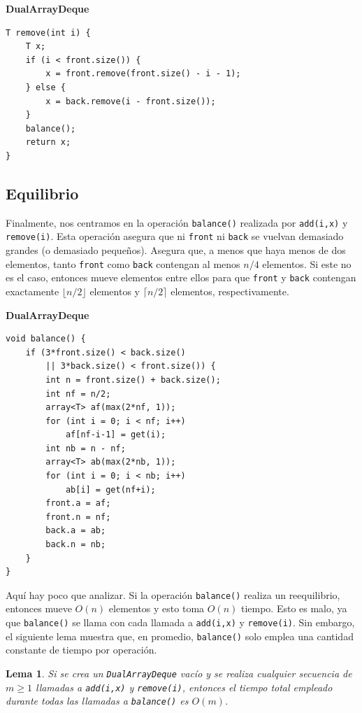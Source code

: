 \documentclass[11pt]{book}
\theoremstyle{plain}
\newtheorem{lema}{Lema}[chapter]
\newcommand{\claseheader}[1]{\noindent\textbf{#1}\par\vspace{-4pt}}
\begin{document}
\claseheader{DualArrayDeque}
\begin{lstlisting}
T remove(int i) {
    T x;
    if (i < front.size()) {
        x = front.remove(front.size() - i - 1);
    } else {
        x = back.remove(i - front.size());
    }
    balance();
    return x;
}
\end{lstlisting}

\subsection{Equilibrio}

Finalmente, nos centramos en la operación \texttt{balance()} realizada por \texttt{add(i,x)} y \texttt{remove(i)}. Esta operación asegura que ni \texttt{front} ni \texttt{back} se vuelvan demasiado grandes (o demasiado pequeños). Asegura que, a menos que haya menos de dos elementos, tanto \texttt{front} como \texttt{back} contengan al menos $n/4$ elementos. Si este no es el caso, entonces mueve elementos entre ellos para que \texttt{front} y \texttt{back} contengan exactamente $\lfloor n/2 \rfloor$ elementos y $\lceil n/2 \rceil$ elementos, respectivamente.

\claseheader{DualArrayDeque}
\begin{lstlisting}
void balance() {
    if (3*front.size() < back.size()
        || 3*back.size() < front.size()) {
        int n = front.size() + back.size();
        int nf = n/2;
        array<T> af(max(2*nf, 1));
        for (int i = 0; i < nf; i++)
            af[nf-i-1] = get(i);
        int nb = n - nf;
        array<T> ab(max(2*nb, 1));
        for (int i = 0; i < nb; i++)
            ab[i] = get(nf+i);
        front.a = af;
        front.n = nf;
        back.a = ab;
        back.n = nb;
    }
}
\end{lstlisting}

Aquí hay poco que analizar. Si la operación \texttt{balance()} realiza un reequilibrio, entonces mueve $O(n)$ elementos y esto toma $O(n)$ tiempo. Esto es malo, ya que \texttt{balance()} se llama con cada llamada a \texttt{add(i,x)} y \texttt{remove(i)}. Sin embargo, el siguiente lema muestra que, en promedio, \texttt{balance()} solo emplea una cantidad constante de tiempo por operación.

\begin{lema}
Si se crea un \texttt{DualArrayDeque} vacío y se realiza cualquier secuencia de $m \ge 1$ llamadas a \texttt{add(i,x)} y \texttt{remove(i)}, entonces el tiempo total empleado durante todas las llamadas a \texttt{balance()} es $O(m)$.
\end{lema}
\end{document}
